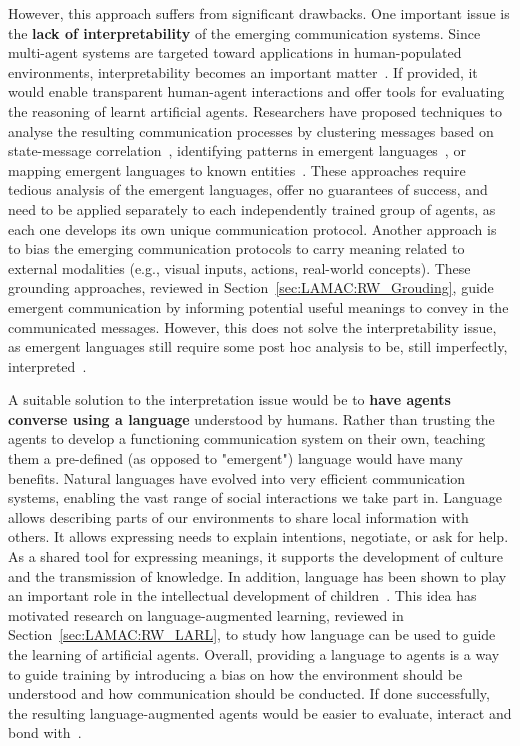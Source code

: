 However, this approach suffers from significant drawbacks. One important issue is the \textbf{lack of interpretability} of the emerging communication systems. Since multi-agent systems are targeted toward applications in human-populated environments, interpretability becomes an important matter~\citep{Mikolov2018_RoadmapMachineIntell}. If provided, it would enable transparent human-agent interactions and offer tools for evaluating the reasoning of learnt artificial agents. Researchers have proposed techniques to analyse the resulting communication processes by clustering messages based on state-message correlation~\citep{Lin2021_GroundMAC, Tucker2021_DiscreteEC, Li2022_EmDicrComm, Karten2023_InterpretEmComm}, identifying patterns in emergent languages~\citep{Havrylov2017_EmergenceLang}, or mapping emergent languages to known entities~\citep{Kottur2017_NaturLangEmerg}. These approaches require tedious analysis of the emergent languages, offer no guarantees of success, and need to be applied separately to each independently trained group of agents, as each one develops its own unique communication protocol. 
Another approach is to bias the emerging communication protocols to carry meaning related to external modalities (e.g., visual inputs, actions, real-world concepts). These grounding approaches, reviewed in Section~\ref{sec:LAMAC:RW_Grouding}, guide emergent communication by informing potential useful meanings to convey in the communicated messages. However, this does not solve the interpretability issue, as emergent languages still require some post hoc analysis to be, still imperfectly, interpreted~\citep{Lin2021_GroundMAC, Tucker2021_DiscreteEC}. 

A suitable solution to the interpretation issue would be to \textbf{have agents converse using a language} understood by humans. 
Rather than trusting the agents to develop a functioning communication system on their own, teaching them a pre-defined (as opposed to "emergent") language would have many benefits. 
Natural languages have evolved into very efficient communication systems, enabling the vast range of social interactions we take part in. Language allows describing parts of our environments to share local information with others. It allows expressing needs to explain intentions, negotiate, or ask for help. As a shared tool for expressing meanings, it supports the development of culture and the transmission of knowledge. 
In addition, language has been shown to play an important role in the intellectual development of children~\citep{Vygotsky1934, Tomasello2009_Cultural}. This idea has motivated research on language-augmented learning, reviewed in Section~\ref{sec:LAMAC:RW_LARL}, to study how language can be used to guide the learning of artificial agents. 
Overall, providing a language to agents is a way to guide training by introducing a bias on how the environment should be understood and how communication should be conducted. If done successfully, the resulting language-augmented agents would be easier to evaluate, interact and bond with~\citep{Crandall2018_CoopWithMachines, Mikolov2018_RoadmapMachineIntell, Liu2022_ChildChatbotReading}. 

